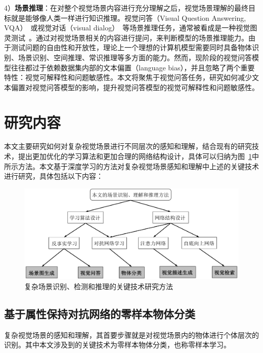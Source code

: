 4）\textbf{场景推理}：在对整个视觉场景内容进行充分理解之后，视觉场景理解的最终目标就是能够像人类一样进行知识推理。视觉问答（Visual Question Answering, VQA）~\cite{antol2015vqa}或视觉对话（visual dialog）~\cite{das2017visual}等场景推理任务，通常被看成是一种视觉图灵测试~\cite{malinowski2014towards,geman2015visual}。通过对视觉场景相关的内容进行提问，来判断模型的场景推理能力。由于测试问题的自由性和开放性，理论上一个理想的计算机模型需要同时具备物体识别、场景识别、空间推理、常识推理等多方面的能力。然而，现阶段的视觉问答模型往往都过于依赖数据集内部的文本偏置（language bias），并且忽略了两个重要特性：视觉可解释性和问题敏感性。本文将聚焦于视觉问答任务，研究如何减少文本偏置对视觉问答模型的影响，提升视觉问答模型的视觉可解释性和问题敏感性。


\section{研究内容}

本文主要研究如何对复杂视觉场景进行不同层次的感知和理解，结合现有的研究技术，提出更加优化的学习算法和更加合理的网络结构设计，具体可以归纳为图~\ref{ch1:fig:technique_summary}中所示方法。本文基于深度学习的方法对复杂视觉场景感知和理解中上述的关键技术进行研究，具体包括以下内容：

\begin{figure}[t]
    \centering
        \includegraphics[width=0.95\linewidth]{chapter1/res/technique_summary.pdf}
    \centering
    \caption{复杂场景识别、检测和推理的关键技术研究方法}
    \label{ch1:fig:technique_summary}
\end{figure}

\subsection{基于属性保持对抗网络的零样本物体分类}
复杂视觉场景的感知和理解，其首要步骤就是对视觉场景内的物体进行个体层次的识别。其中本文涉及到的关键技术为零样本物体分类，也称零样本学习。

